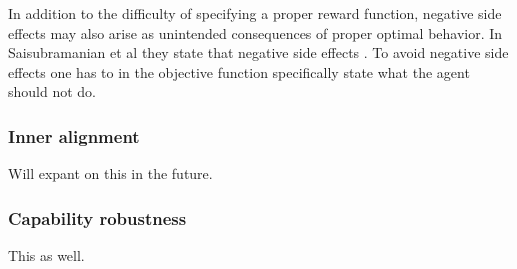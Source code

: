 \documentclass[12pt,A4]{report}
\newcommand{\autobaj}{}
\theoremstyle{definition}
\begin{document}

In addition to the difficulty of specifying a proper reward function, negative side effects may also arise as unintended consequences of proper optimal behavior. In \autobaj{Saisubramanian et al} they state that negative side effects . To avoid negative side effects one has to in the objective function specifically state what the agent should not do.

\subsubsection{Inner alignment}
Will expant on this in the future.

\subsubsection{Capability robustness}
This as well.

\end{document}
